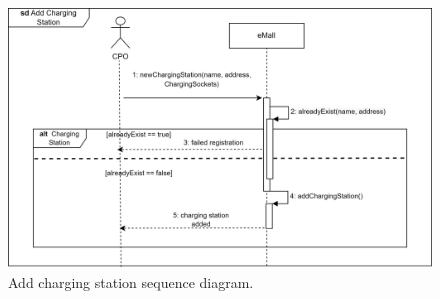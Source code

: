 \begin{figure}[H]
    \centering
    \includegraphics[width=\textwidth]{images/sd_add_station.png}
    \caption{Add charging station sequence diagram.}
    \label{fig:sd_add_charging_station}
\end{figure}
